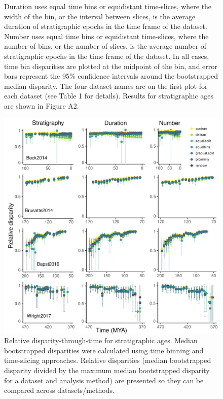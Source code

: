 \documentclass[12pt,a4paper]{article}
\begin{document}
\begin{figure}[!htbp]
{    Duration uses equal time bins or equidistant time-slices, where the width of the bin, or the interval between slices, is the average duration of stratigraphic epochs in the time frame of the dataset. 
    Number uses equal time bins or equidistant time-slices, where the number of bins, or the number of slices, is the average number of stratigraphic epochs in the time frame of the dataset. 
    In all cases, time bin disparities are plotted at the midpoint of the bin, and error bars represent the 95\% confidence intervals around the bootstrapped median disparity.
    The four dataset names are on the first plot for each dataset (see Table 1 for details).
    Results for stratigraphic ages are shown in Figure A2.}
    \label{figure:dtt2}
  \end{figure}  

  \begin{figure}[!htbp]
    \centering
    \includegraphics[width=1\linewidth, height=1\textheight, keepaspectratio]{figures/fig-dtt-age-appendix-revision.pdf}
    \caption[Relative disparity through time for four example datasets.]
    {Relative disparity-through-time for stratigraphic ages. 
    Median bootstrapped disparities were calculated using time binning and time-slicing approaches. 
    Relative disparities (median bootstrapped disparity divided by the maximum median bootstrapped disparity for a dataset and analysis method) are presented so they can be compared across datasets/methods. 
}
\end{figure}
\end{document}

